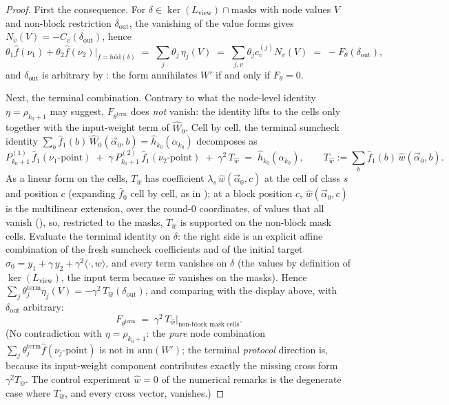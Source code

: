 \documentclass{article}
\theoremstyle{definition}
\begin{document}
\begin{proof}
First the consequence. For $\delta \in \ker(L_{\mathrm{view}}) \cap \mathrm{masks}$ with node values $V$ and non-block restriction $\delta_{\mathrm{out}}$, the vanishing of the value forms gives $N_v(V) = -C_v(\delta_{\mathrm{out}})$, hence
\[
\theta_1 \hat{f}(\nu_1) + \theta_2 \hat{f}(\nu_2) \Big|_{f = \mathrm{fold}(\delta)} \;=\; \sum_j \theta_j\, \eta_j(V) \;=\; \sum_{j, v} \theta_j c^{(j)}_v N_v(V) \;=\; - F_\theta(\delta_{\mathrm{out}}) ,
\]
and $\delta_{\mathrm{out}}$ is arbitrary by : the form annihilates $W'$ if and only if $F_\theta = 0$.

Next, the terminal combination. Contrary to what the node-level identity $\eta = \rho_{k_0+1}$ may suggest, $F_{\theta^{\mathrm{term}}}$ does \emph{not} vanish: the identity lifts to the cells only together with the input-weight term of $\hat{W}_0$. Cell by cell, the terminal sumcheck identity $\sum_b \hat{f}_1(b)\, \hat{W}_0(\vec{\alpha}_0, b) = \hat{h}_{k_0}(\alpha_{k_0})$ decomposes as
\[
P^{(1)}_{k_0+1}\, \hat{f}_1(\nu_1\text{-point}) \;+\; \gamma\, P^{(2)}_{k_0+1}\, \hat{f}_1(\nu_2\text{-point}) \;+\; \gamma^2\, T_{\hat{w}} \;=\; \hat{h}_{k_0}(\alpha_{k_0}) , \qquad T_{\hat{w}} := \sum_{b} \hat{f}_1(b)\, \hat{w}(\vec{\alpha}_0, b) .
\]
As a linear form on the cells, $T_{\hat{w}}$ has coefficient $\lambda_s\, \hat{w}(\vec{\alpha}_0, c)$ at the cell of class $s$ and position $c$ (expanding $\hat{f}_0$ cell by cell, as in ); at a block position $c$, $\hat{w}(\vec{\alpha}_0, c)$ is the multilinear extension, over the round-$0$ coordinates, of values that all vanish (), so, restricted to the masks, $T_{\hat{w}}$ is supported on the non-block mask cells. Evaluate the terminal identity on $\delta$: the right side is an explicit affine combination of the fresh sumcheck coefficients and of the initial target $\sigma_0 = y_1 + \gamma\, y_2 + \gamma^2 \langle \cdot, w \rangle$, and every term vanishes on $\delta$ (the values by definition of $\ker(L_{\mathrm{view}})$, the input term because $\hat{w}$ vanishes on the masks). Hence $\sum_j \theta^{\mathrm{term}}_j \eta_j(V) = -\gamma^2\, T_{\hat{w}}(\delta_{\mathrm{out}})$, and comparing with the display above, with $\delta_{\mathrm{out}}$ arbitrary:
\[
F_{\theta^{\mathrm{term}}} \;=\; \gamma^2\, T_{\hat{w}} \big|_{\text{non-block mask cells}} .
\]
(No contradiction with $\eta = \rho_{k_0+1}$: the \emph{pure} node combination $\sum_j \theta^{\mathrm{term}}_j \hat{f}(\nu_j\text{-point})$ is not in $\mathrm{ann}(W')$; the terminal \emph{protocol} direction is, because its input-weight component contributes exactly the missing cross form $\gamma^2 T_{\hat{w}}$. The control experiment $\hat{w} = 0$ of the numerical remarks is the degenerate case where $T_{\hat{w}}$, and every cross vector, vanishes.)


\end{proof}
\end{document}
